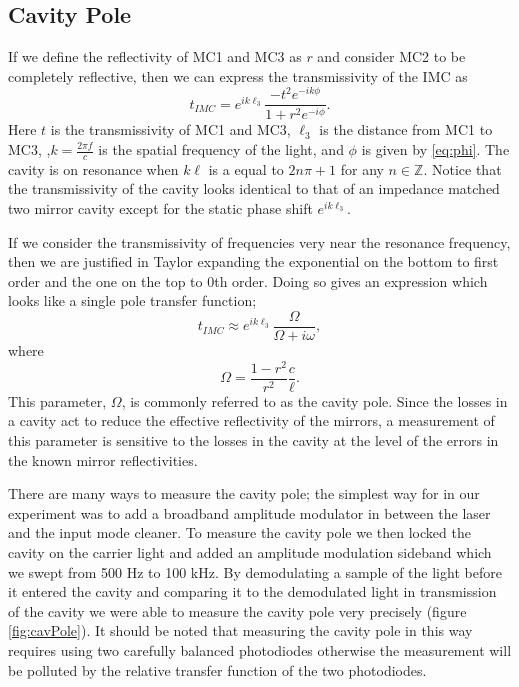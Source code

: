 \documentclass[10pt]{article}
\begin{document}
\subsection{Cavity Pole}
If we define the reflectivity of MC1 and MC3 as $r$ and consider MC2 to be completely reflective, 
then we can express the transmissivity of the IMC as
\begin{equation}
	t_{IMC}=e^{ik\ell_3}\frac{-t^2e^{-ik\phi}}{1+r^2e^{-i\phi}}.
\end{equation}
Here $t$ is the transmissivity of MC1 and MC3, $\ell_3$ is the distance from MC1 to MC3, 
,$k=\tfrac{2\pi f}{c}$ is the spatial frequency of the light, and 
$\phi$ is given by \eqref{eq:phi}.
The cavity is on resonance when $k\ell$ is a equal to $2n\pi+1$ for any $n\in\mathbb{Z}$.  
Notice that the transmissivity of the cavity looks identical to that of an impedance matched 
two mirror cavity except for the static phase shift $e^{ik\ell_3}$.  

If we consider the transmissivity of frequencies very near the resonance frequency, 
then we are justified in Taylor expanding the exponential on the bottom to first order 
and the one on the top to 0th order.
Doing so gives an expression which looks like a single pole transfer function;
\begin{equation}
	t_{IMC}\approx e^{ik\ell_3}\frac{\Omega}{\Omega+i\omega},
	\label{eq:PoleApx}
\end{equation}
where
\begin{equation}
	\Omega=\frac{1-r^2}{r^2}\frac{c}{\ell}.
\end{equation}
This parameter, $\Omega$, is commonly referred to as the cavity pole.  
Since the losses in a cavity act to reduce the effective reflectivity of the mirrors, 
a measurement of this parameter is sensitive to the losses in the cavity at the level 
of the errors in the known mirror reflectivities.

There are many ways to measure the cavity pole; 
the simplest way for in our experiment was to add a broadband amplitude modulator in between the laser 
and the input mode cleaner.  
To measure the cavity pole we then locked the cavity on the carrier light and added 
an amplitude modulation sideband which we swept from 500 Hz to 100 kHz.  
By demodulating a sample of the light before it entered the cavity and comparing 
it to the demodulated light in transmission of the cavity we were able to 
measure the cavity pole very precisely (figure \ref{fig:cavPole}).  
It should be noted that measuring the cavity pole in this way requires using two 
carefully balanced photodiodes otherwise the measurement will be polluted by the 
relative transfer function of the two photodiodes.
\end{document}
